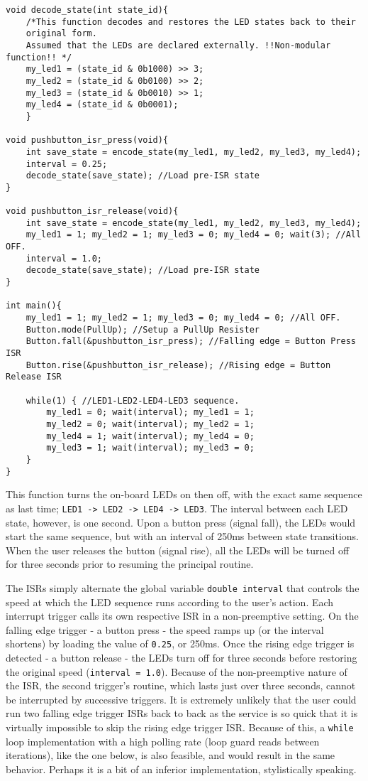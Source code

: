 \documentclass{article}
\begin{document}
\begin{verbatim}
void decode_state(int state_id){
    /*This function decodes and restores the LED states back to their
    original form.
    Assumed that the LEDs are declared externally. !!Non-modular function!! */
    my_led1 = (state_id & 0b1000) >> 3;
    my_led2 = (state_id & 0b0100) >> 2;
    my_led3 = (state_id & 0b0010) >> 1;
    my_led4 = (state_id & 0b0001);
    }

void pushbutton_isr_press(void){
    int save_state = encode_state(my_led1, my_led2, my_led3, my_led4);
    interval = 0.25;
    decode_state(save_state); //Load pre-ISR state
}

void pushbutton_isr_release(void){
    int save_state = encode_state(my_led1, my_led2, my_led3, my_led4);
    my_led1 = 1; my_led2 = 1; my_led3 = 0; my_led4 = 0; wait(3); //All OFF.
    interval = 1.0;
    decode_state(save_state); //Load pre-ISR state
}

int main(){
    my_led1 = 1; my_led2 = 1; my_led3 = 0; my_led4 = 0; //All OFF.
    Button.mode(PullUp); //Setup a PullUp Resister
    Button.fall(&pushbutton_isr_press); //Falling edge = Button Press ISR
    Button.rise(&pushbutton_isr_release); //Rising edge = Button Release ISR
    
    while(1) { //LED1-LED2-LED4-LED3 sequence.
        my_led1 = 0; wait(interval); my_led1 = 1;
        my_led2 = 0; wait(interval); my_led2 = 1;
        my_led4 = 1; wait(interval); my_led4 = 0;
        my_led3 = 1; wait(interval); my_led3 = 0;
    }
}
\end{verbatim}

This function turns the on-board LEDs on then off, with the exact same sequence as last time; \texttt{LED1 -> LED2 -> LED4 -> LED3}. The interval between each LED state, however, is one second. Upon a button press (signal fall), the LEDs would start the same sequence, but with an interval of 250ms between state transitions. When the user releases the button (signal rise), all the LEDs will be turned off for three seconds prior to resuming the principal routine.

The ISRs simply alternate the global variable \texttt{double interval} that controls the speed at which the LED sequence runs according to the user's action. Each interrupt trigger calls its own respective ISR in a non-preemptive setting. On the falling edge trigger - a button press - the speed ramps up (or the interval shortens) by loading the value of \texttt{0.25}, or 250ms. Once the rising edge trigger is detected - a button release - the LEDs turn off for three seconds before restoring the original speed (\texttt{interval = 1.0}). Because of the non-preemptive nature of the ISR, the second trigger's routine, which lasts just over three seconds, cannot be interrupted by successive triggers. It is extremely unlikely that the user could run two falling edge trigger ISRs back to back as the service is so quick that it is virtually impossible to skip the rising edge trigger ISR. Because of this, a \texttt{while} loop implementation with a high polling rate (loop guard reads between iterations), like the one below, is also feasible, and would result in the same behavior. Perhaps it is a bit of an inferior implementation, stylistically speaking.
\end{document}
